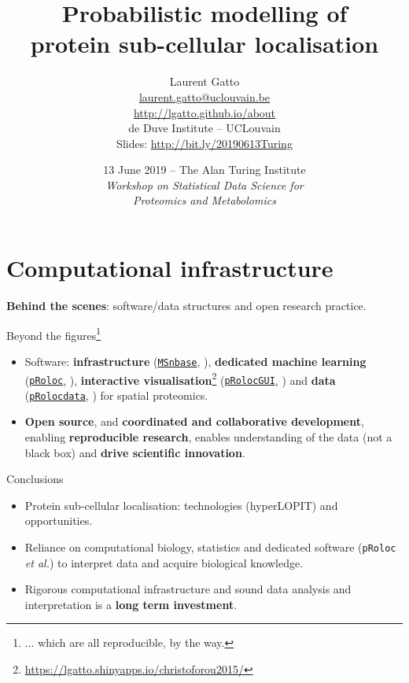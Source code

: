 \documentclass[presentation]{beamer}
\date{13 June 2019 -- The Alan Turing Institute \\ \textit{Workshop on
    Statistical Data Science for\\ Proteomics and Metabolomics}}
\title{Probabilistic modelling of \\ protein sub-cellular localisation}
\author{Laurent Gatto\\
  \url{laurent.gatto@uclouvain.be}\\
  \url{http://lgatto.github.io/about}\\
  de Duve Institute -- UCLouvain\\
  \vspace{2mm}
  Slides: \url{http://bit.ly/20190613Turing}
}
\begin{document}
\maketitle





\section{Computational infrastructure}

\begin{frame}{}
  \begin{center}
    \Large{\textbf{Behind the scenes}: software/data structures and
      open research practice.}
  \end{center}
\end{frame}


\begin{frame}{}

  Beyond the figures\footnote{... which are all reproducible, by the way.}

  \begin{itemize}
  \item Software: \textbf{infrastructure}
    (\href{http://bioconductor.org/packages/MSnbase}{\texttt{MSnbase}},
    \cite{Gatto:2012}), \textbf{dedicated machine learning}
    (\href{http://bioconductor.org/packages/pRoloc}{\texttt{pRoloc}},
    \cite{Gatto:2014a}), \textbf{interactive
      visualisation}\footnote{\url{https://lgatto.shinyapps.io/christoforou2015/}}
    (\href{http://bioconductor.org/packages/pRolocGUI}{\texttt{pRolocGUI}},
    \cite{pRolocGUI}) and \textbf{data}
    (\href{http://bioconductor.org/packages/pRolocdata}{\texttt{pRolocdata}},
    \cite{Gatto:2014a}) for spatial proteomics.
  \item \textbf{Open source}, and \textbf{coordinated and
    collaborative development}, enabling \textbf{reproducible
    research}, enables understanding of the data (not a black box) and
    \textbf{drive scientific innovation}.
  \end{itemize}
\end{frame}


\begin{frame}[fragile]{Conclusions}
  \begin{itemize}
  \item Protein sub-cellular localisation: technologies (hyperLOPIT)
    and opportunities.

  \item Reliance on computational biology, statistics and dedicated
    software (\texttt{pRoloc} \textit{et al.}) to interpret data and
    acquire biological knowledge.

  \item Rigorous computational infrastructure and sound data analysis
    and interpretation is a \textbf{long term investment}.

  \end{itemize}

\end{frame}
\end{document}
